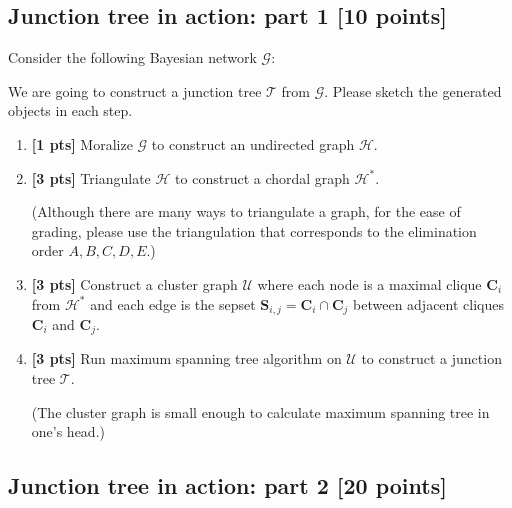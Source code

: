 \documentclass[12pt]{article}
\newcommand{\Gcal}{\mathcal{G}}
\newcommand{\Hcal}{\mathcal{H}}
\newcommand{\Ucal}{\mathcal{U}}
\newcommand{\Tcal}{\mathcal{T}}
\newcommand{\Cbs}{\boldsymbol{C}}
\newcommand{\Sbs}{\boldsymbol{S}}
\begin{document}
\subsection{Junction tree in action: part 1 [10 points]}



Consider the following Bayesian network $ \Gcal $:
\begin{figure}[h]
	\centering
\end{figure}

We are going to construct a junction tree $ \Tcal $ from $ \Gcal $.
Please sketch the generated objects in each step.

\begin{enumerate}
	\item \textbf{[1 pts]} Moralize $ \Gcal $ to construct an undirected graph $ \Hcal $.



	\item \textbf{[3 pts]} Triangulate $ \Hcal $ to construct a chordal graph $ \Hcal^* $.

	      (Although there are many ways to triangulate a graph, for the ease of grading, please use the triangulation that corresponds to the elimination order $ A, B, C, D, E $.)


	\item \textbf{[3 pts]} Construct a cluster graph $ \Ucal $ where each node is a maximal clique $ \Cbs_i $ from $ \Hcal^* $ and each edge is the sepset $ \Sbs_{i,j} = \Cbs_i \cap \Cbs_j $ between adjacent cliques $ \Cbs_i $ and $ \Cbs_j $.




	\item \textbf{[3 pts]} Run maximum spanning tree algorithm on $ \Ucal $ to construct a junction tree $ \Tcal $.

	      (The cluster graph is small enough to calculate maximum spanning tree in one's head.)


\end{enumerate}



\subsection{Junction tree in action: part 2 [20 points]}
\end{document}

